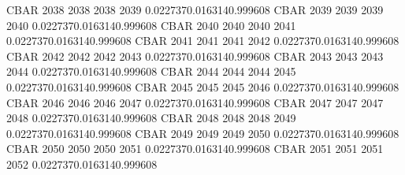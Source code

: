 CBAR    2038    2038    2038    2039    0.0227370.0163140.999608     
CBAR    2039    2039    2039    2040    0.0227370.0163140.999608     
CBAR    2040    2040    2040    2041    0.0227370.0163140.999608     
CBAR    2041    2041    2041    2042    0.0227370.0163140.999608     
CBAR    2042    2042    2042    2043    0.0227370.0163140.999608     
CBAR    2043    2043    2043    2044    0.0227370.0163140.999608     
CBAR    2044    2044    2044    2045    0.0227370.0163140.999608     
CBAR    2045    2045    2045    2046    0.0227370.0163140.999608     
CBAR    2046    2046    2046    2047    0.0227370.0163140.999608     
CBAR    2047    2047    2047    2048    0.0227370.0163140.999608     
CBAR    2048    2048    2048    2049    0.0227370.0163140.999608     
CBAR    2049    2049    2049    2050    0.0227370.0163140.999608     
CBAR    2050    2050    2050    2051    0.0227370.0163140.999608     
CBAR    2051    2051    2051    2052    0.0227370.0163140.999608      

